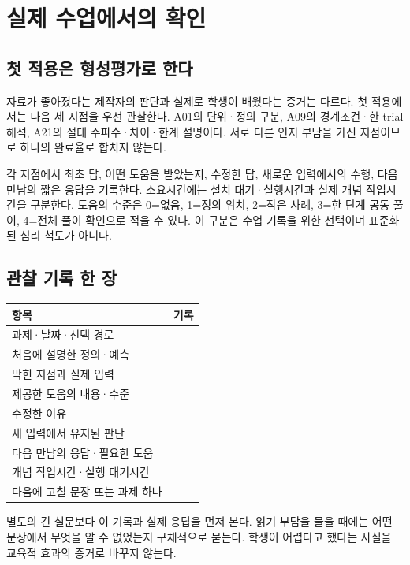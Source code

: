 \documentclass[
  10pt,
  a4paper,
]{article}
\begin{document}
\section{실제 수업에서의
확인}\label{uxc2e4uxc81c-uxc218uxc5c5uxc5d0uxc11cuxc758-uxd655uxc778}

\subsection{첫 적용은 형성평가로
한다}\label{uxccab-uxc801uxc6a9uxc740-uxd615uxc131uxd3c9uxac00uxb85c-uxd55cuxb2e4}

자료가 좋아졌다는 제작자의 판단과 실제로 학생이 배웠다는 증거는 다르다.
첫 적용에서는 다음 세 지점을 우선 관찰한다. A01의 단위·정의 구분, A09의
경계조건·한 trial 해석, A21의 절대 주파수·차이·한계 설명이다. 서로 다른
인지 부담을 가진 지점이므로 하나의 완료율로 합치지 않는다.

각 지점에서 최초 답, 어떤 도움을 받았는지, 수정한 답, 새로운 입력에서의
수행, 다음 만남의 짧은 응답을 기록한다. 소요시간에는 설치
대기·실행시간과 실제 개념 작업시간을 구분한다. 도움의 수준은 0=없음,
1=정의 위치, 2=작은 사례, 3=한 단계 공동 풀이, 4=전체 풀이 확인으로 적을
수 있다. 이 구분은 수업 기록을 위한 선택이며 표준화된 심리 척도가
아니다.

\subsection{관찰 기록 한
장}\label{uxad00uxcc30-uxae30uxb85d-uxd55c-uxc7a5}

\begin{longtable}[]{@{}ll@{}}
\toprule\noalign{}
항목 & 기록 \\
\midrule\noalign{}
\endhead
\bottomrule\noalign{}
\endlastfoot
과제·날짜·선택 경로 & \\
처음에 설명한 정의·예측 & \\
막힌 지점과 실제 입력 & \\
제공한 도움의 내용·수준 & \\
수정한 이유 & \\
새 입력에서 유지된 판단 & \\
다음 만남의 응답·필요한 도움 & \\
개념 작업시간·실행 대기시간 & \\
다음에 고칠 문장 또는 과제 하나 & \\
\end{longtable}

별도의 긴 설문보다 이 기록과 실제 응답을 먼저 본다. 읽기 부담을 물을
때에는 어떤 문장에서 무엇을 알 수 없었는지 구체적으로 묻는다. 학생이
어렵다고 했다는 사실을 교육적 효과의 증거로 바꾸지 않는다.
\end{document}
